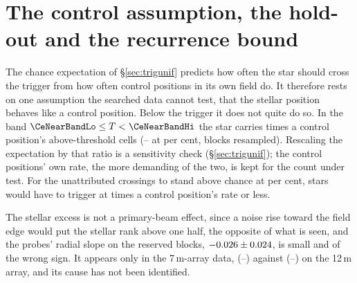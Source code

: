\section{The control assumption, the hold-out and the recurrence bound}
\label{app:radius}

The chance expectation of \S\ref{sec:trigunif} predicts how often the star
should cross the trigger from how often control positions in its own field
do. It therefore rests on one assumption the searched data cannot test,
that the stellar position behaves like a control position. Below the trigger it does
not quite do so. In the band $\CeNearBandLo\le T<\CeNearBandHi$ the star
carries \CeNear{} times a control position's above-threshold cells
(\CeNearIntLo--\CeNearIntHi{} at \CeCovPct{} per cent, blocks resampled).
Rescaling the expectation by that ratio is a sensitivity check
(\S\ref{sec:trigunif}); the control positions' own rate, the more demanding
of the two, is kept for the count under test. For the \CeObs{}
unattributed crossings to stand above chance at \CeAlphaPct{} per cent, stars
would have to trigger at \CeRCrit{} times a control position's rate or less.

The stellar excess is not a primary-beam effect, since a noise rise toward the field
edge would put the stellar rank above one half, the opposite of what is
seen, and the probes' radial slope on the reserved blocks,
$-0.026\pm0.024$, is small and of the wrong sign. It appears
only in the 7\,m-array data, \BgArrSevenRatio{}
(\BgArrSevenRatioLo--\BgArrSevenRatioHi) against \BgArrTwelveRatio{}
(\BgArrTwelveRatioLo--\BgArrTwelveRatioHi) on the 12\,m array, and its cause
has not been identified.


